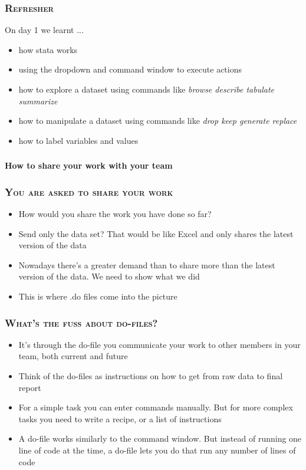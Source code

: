 \documentclass[10pt]{beamer}
\begin{document}
	
	\begin{frame}
		\frametitle{\textsc{Refresher}}
		On day 1 we learnt ...
		\begin{itemize}
			\item how stata works
			\item using the dropdown and command window to execute actions
			\item how to explore a dataset using commands like \textit{browse describe tabulate summarize}
			\item how to manipulate a dataset using commands like \textit{drop keep generate replace}
			\item how to label variables and values
		\end{itemize}
	\end{frame}
	
	\begin{frame}
		\frametitle{\textsc{}}

		\begin{center}
			\Large  \textbf{How to share your work with your team}
		\end{center}
	\end{frame}

	\begin{frame}
		\frametitle{\textsc{You are asked to share your work}}

		\begin{itemize}
			\item How would you share the work you have done so far?
			\item Send only the data set? That would be like Excel and only shares the latest version of the data
			\item Nowadays there's a greater demand than to share more than the latest version of the data. We need to show what we did
			\item This is where .do files come into the picture

		\end{itemize}
	\end{frame}

		\begin{frame}
			\frametitle{\textsc{What's the fuss about do-files?}}
			
			\begin{itemize}
				\item It's through the do-file you communicate your work to other members in your team, both current and future
				\item Think of the do-files as instructions on how to get from raw data to final report
				\item For a simple task you can enter commands manually. But for more complex tasks you need to write a recipe, or a list of instructions
				\item A do-file works similarly to the command window. But instead of running one line of code at the time, a do-file lets you do that run any number of lines of code

				
				\end{itemize}
			\end{frame}
			
\end{document}
